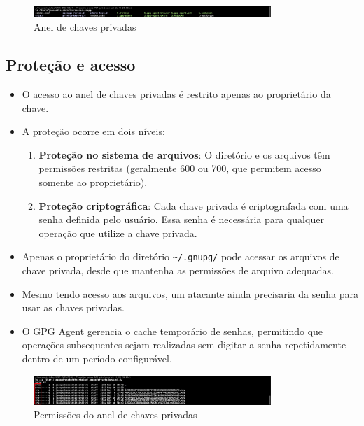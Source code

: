 \begin{figure}[htb]
    \centering
    \includegraphics[width=0.8\textwidth]{images/04-anel_chaves_privadas.jpg}
    \caption{Anel de chaves privadas}
    \label{fig:anel-chaves-privadas}
\end{figure}

\subsection{Proteção e acesso}
\begin{itemize}
    \item O acesso ao anel de chaves privadas é restrito apenas ao proprietário da chave.
    \item A proteção ocorre em dois níveis:
    \begin{enumerate}
        \item \textbf{Proteção no sistema de arquivos}: O diretório e os arquivos têm permissões restritas (geralmente 600 ou 700, que permitem acesso somente ao proprietário).
        \item \textbf{Proteção criptográfica}: Cada chave privada é criptografada com uma senha definida pelo usuário. Essa senha é necessária para qualquer operação que utilize a chave privada.
    \end{enumerate}
    \item Apenas o proprietário do diretório \texttt{\~{}/.gnupg/} pode acessar os arquivos de chave privada, desde que mantenha as permissões de arquivo adequadas.
    \item Mesmo tendo acesso aos arquivos, um atacante ainda precisaria da senha para usar as chaves privadas.
    \item O GPG Agent gerencia o cache temporário de senhas, permitindo que operações subsequentes sejam realizadas sem digitar a senha repetidamente dentro de um período configurável.
\end{itemize}

\begin{figure}[htb]
    \centering
    \includegraphics[width=0.8\textwidth]{images/04-permissoes_anel_chaves_privadas.jpeg}
    \caption{Permissões do anel de chaves privadas}
    \label{fig:permissoes-anel}
\end{figure}

